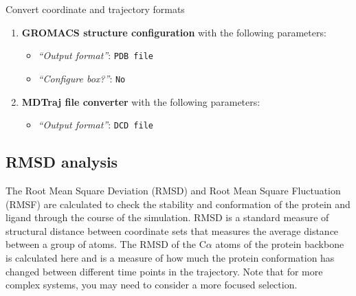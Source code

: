 \documentclass[twocolumn]{bmcart}%
\providecommand{\tightlist}{%
  \setlength{\itemsep}{0pt}\setlength{\parskip}{0pt}}
\begin{document}
\begin{handson_box_colour}{Convert coordinate and trajectory formats}
\begin{enumerate}
\def\labelenumi{\arabic{enumi}.}
 \item
  \textbf{GROMACS structure configuration} with the following
  parameters:

  \begin{itemize}
  \tightlist
  \item
    \emph{``Output format''}: \texttt{PDB\ file}
  \item
    \emph{``Configure box?''}: \texttt{No}
  \end{itemize}

 \item
  \textbf{MDTraj file converter} with the following parameters:

  \begin{itemize}
  \tightlist
  \item
    \emph{``Output format''}: \texttt{DCD\ file}
  \end{itemize}
\end{enumerate}
\end{handson_box_colour}




\hypertarget{rmsd-analysis}{%
\subsection*{RMSD analysis}\label{rmsd-analysis}}


The Root Mean Square Deviation (RMSD) and Root Mean Square Fluctuation (RMSF) are calculated to check the stability and conformation of the protein and ligand through the course of the simulation. 
RMSD is a standard measure of structural distance between coordinate
sets that measures the average distance between a group of atoms. The
RMSD of the C$\alpha$ atoms of the protein backbone is calculated here and
is a measure of how much the protein conformation has changed between different time points in the trajectory. Note that for more complex systems, you may need to consider a more focused selection.
\end{document}
